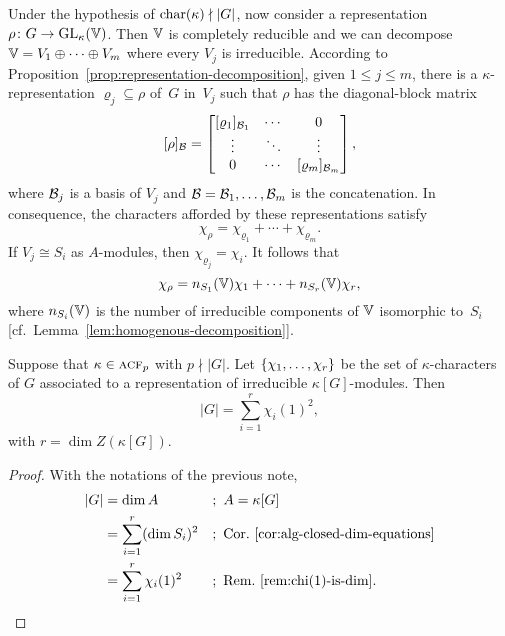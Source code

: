 \begin{rem}\label{rem:characters-as-integer-combinations}
    Under the hypothesis of $\operatorname{char}(\kappa)\nmid|G|$, now consider a representation $\rho\colon G\to{\rm GL}_\kappa(\mathbb V)$. Then $\mathbb V$ is completely reducible and we can decompose $\mathbb V=V_1\oplus\cdots\oplus V_m$ where every $V_j$ is irreducible. According to Proposition~\ref{prop:representation-decomposition}, given $1\le j\le m$, there is a $\kappa$-representation $\varrho_j\subseteq\rho$ of~$G$ in~$V_j$ such that $\rho$ has the diagonal-block matrix
    \begin{equation}\label{eq:block-diagonal-representation-2}
        [\rho]_{\mathcal B}= \begin{bmatrix}
            [\varrho_1]_{\mathcal B_1}  &\cdots &0\\
            \vdots  &\ddots &\vdots\\
            0   &\cdots &[\varrho_m]_{\mathcal B_m}
        \end{bmatrix},
    \end{equation}
    where $\mathcal B_j$ is a basis of $V_j$ and $\mathcal B=\mathcal B_1,\dots,\mathcal B_m$ is the concatenation. In consequence, the characters afforded by these representations satisfy
    $$
        \chi_\rho = \chi_{\varrho_1}+\cdots+\chi_{\varrho_m}.
    $$
    If $V_j\cong S_i$ as $A$-modules, then $\chi_{\varrho_j}=\chi_i$. It follows that
    \begin{equation}\label{eq:integer-combination-of-characters-2}
        \chi_\rho = n_{S_1}(\mathbb V)\chi_1+\cdots+n_{S_r}(\mathbb V)\chi_r,
    \end{equation}
    where $n_{S_i}(\mathbb V)$ is the number of irreducible components of $\mathbb V$ isomorphic to~$S_i$ [cf.~Lemma~\ref{lem:homogenous-decomposition}].
\end{rem}

\begin{prop}\label{prop:sum-chi-squared}
    Suppose that\/ $\kappa\in\operatorname{\textnormal{\textsc{acf}}}_p$ with\/ $p\nmid|G|$. Let\/ $\{\chi_1,\dots,\chi_r\}$ be the set of\/ $\kappa$-characters of\/ $G$ associated to a representation of irreducible $\kappa[G]$-modules. Then
    $$
        |G| = \sum_{i=1}^r\chi_i(1)^2,
    $$
    with $r=\dim Z(\kappa[G])$.
\end{prop}

\begin{proof}
    With the notations of the previous note, 
    \begin{align*}
        |G| &= \dim A
                &&;\ A=\kappa[G]\\
            &= \sum_{i=1}^r(\dim S_i)^2
                &&;\ \text{Cor.~}\ref{cor:alg-closed-dim-equations}\\
            &= \sum_{i=1}^r\chi_i(1)^2
                &&;\ \text{Rem.~}\ref{rem:chi(1)-is-dim}.
    \end{align*}
\end{proof}

